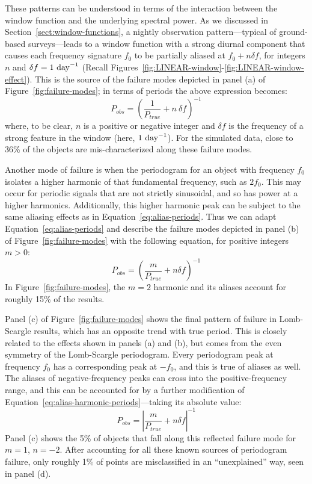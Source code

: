 \documentclass[preprint]{aastex}
\newcommand{\fig}[1]{Figure~\ref{fig:#1}}
\newcommand{\figs}[2]{Figures~\ref{fig:#1}-\ref{fig:#2}}
\newcommand{\Eq}[1]{Equation~\ref{eq:#1}}
\newcommand{\eq}[1]{\Eq{#1}}
\newcommand{\eqlabel}[1]{\label{eq:#1}}
\newcommand{\Sect}[1]{Section~\ref{sect:#1}}
\newcommand{\sect}[1]{\Sect{#1}}
\begin{document}
These patterns can be understood in terms of the interaction between the
window function and the underlying spectral power.
As we discussed in \sect{window-functions},
a nightly observation pattern---typical of ground-based surveys---leads to
a window function with a strong diurnal component that causes each frequency
signature $f_0$ to be partially aliased at $f_0 + n \delta f$, for integers
$n$ and $\delta f = 1\ {\rm day}^{-1}$
(Recall \figs{LINEAR-window}{LINEAR-window-effect}).
This is the source of the failure modes depicted in panel (a) of
\fig{failure-modes}; in terms of periods the above expression becomes:
\begin{equation}
  P_{obs} = \left(\frac{1}{P_{true}} + n\ \delta f\right)^{-1}
  \eqlabel{alias-periods}
\end{equation}
where, to be clear, $n$ is a positive or negative integer and $\delta f$ is
the frequency of a strong feature in the window  (here, $1\ {\rm day}^{-1}$).
For the simulated data, close to 36\% of the objects are mis-characterized
along these failure modes.

Another mode of failure is when the periodogram for an object with frequency
$f_0$ isolates a higher harmonic of that fundamental frequency, such as $2f_0$.
This may occur for periodic signals that are not strictly sinusoidal, and so
has power at a higher harmonics.
Additionally, this higher harmonic peak can be subject to the same aliasing
effects as in \eq{alias-periods}.
Thus we can adapt \eq{alias-periods} and describe the failure modes depicted
in panel (b) of \fig{failure-modes} with the following equation,
for positive integers $m > 0$:
\begin{equation}
  P_{obs} = \left(\frac{m}{P_{true}} + n\delta f\right)^{-1}
  \eqlabel{alias-harmonic-periods}
\end{equation}
In \fig{failure-modes}, the $m=2$ harmonic and its aliases account for roughly
15\% of the results.

Panel (c) of \fig{failure-modes} shows the final pattern of failure in
Lomb-Scargle results, which has an opposite trend with true period.
This is closely related to the effects shown in panels (a) and (b),
but comes from the even symmetry of the Lomb-Scargle periodogram.
Every periodogram peak at frequency $f_0$ has a corresponding peak at $-f_0$,
and this is true of aliases as well.
The aliases of negative-frequency peaks can cross into the positive-frequency
range, and this can be accounted for by a further modification of
\eq{alias-harmonic-periods}---taking its absolute value:
\begin{equation}
  P_{obs} = \left|\frac{m}{P_{true}} + n\delta f\right|^{-1}
  \eqlabel{failure-modes}
\end{equation}
Panel (c) shows the 5\% of objects that fall along this reflected
failure mode for $m=1$, $n=-2$.
After accounting for all these known sources of periodogram failure,
only roughly 1\% of points are misclassified in an ``unexplained'' way,
seen in panel (d).
\end{document}
